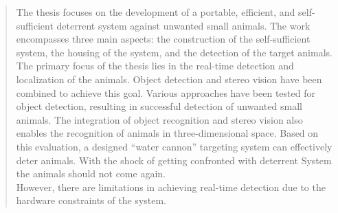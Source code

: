 
\pagestyle{empty}



\begin{abstract}
    The thesis focuses on the development of a portable, efficient, and self-sufficient deterrent system against unwanted small animals. The work encompasses three main aspects: the construction of the self-sufficient system, the housing of the system, and the detection of the target animals.
    \\
    The primary focus of the thesis lies in the real-time detection and localization of the animals. Object detection and stereo vision have been combined to achieve this goal. Various approaches have been tested for object detection, resulting in successful detection of unwanted small animals. The integration of object recognition and stereo vision also enables the recognition of animals in three-dimensional space. Based on this evaluation, a designed \enquote{water cannon} targeting system can effectively deter animals. With the shock of getting confronted with deterrent System the animals should not come again.
    \\
    However, there are limitations in achieving real-time detection due to the hardware constraints of the system.
\end{abstract}



